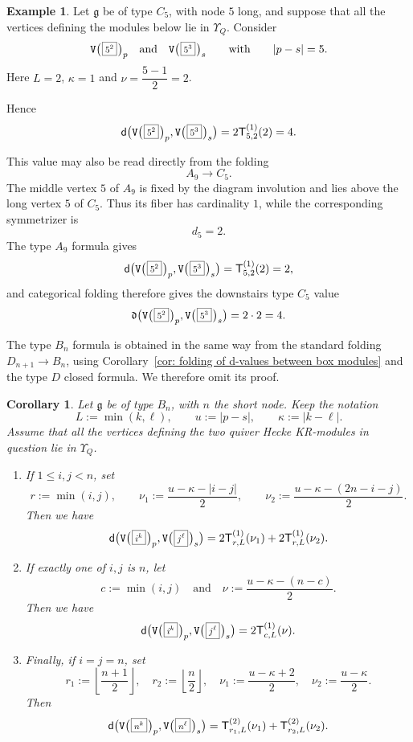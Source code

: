 \documentclass[12pt, leqno]{amsart}
\numberwithin{equation}{section}
\theoremstyle{plain}
\newtheorem{corollary}[lemma]{Corollary}
\theoremstyle{definition}
\newtheorem{example}[lemma]{Example}
\newcommand{\Vkm}[1]{%
  \ttV\bigl(\hspace{0.2ex}\scalebox{.8}{\(\boxed{#1}\)}\hspace{0.2ex}\bigr)%
}
\newcommand{\seteq}{\mathbin{:=}}
\newcommand{\g}{\mathfrak{g}}
\newcommand{\de}{\mathfrak{d}}
\newcommand{\sfT}{\mathsf{T}}
\newcommand{\ttV}{\mathtt{V}}
\newcommand{\qtq}[1][{and}]{\quad\text{{#1}}\quad}
\newcommand{\ee}{\end{enumerate}}
\newcommand{\bnum}{\begin{enumerate}[{\rm (i)}]}
\begin{document}
\begin{example}\label{ex: type C5 folded KR d-value}
Let \(\g\) be of type \(C_5\), with node \(5\) long, and suppose
that all the vertices defining the modules below lie in
\(\Upsilon_Q\).  Consider
\[
\Vkm{5^2}_p \qtq \Vkm{5^3}_s \qquad\text{with}\qquad |p-s|=5.
\]
Here $L=2$, $\kappa=1$ and $\nu=\dfrac{5-1}{2}=2$. 

Hence
\[
\de\bigl( \Vkm{5^2}_p, \Vkm{5^3}_s \bigr)
= 2\sfT^{(1)}_{5,2}(2) = 4.
\]

This value may also be read directly from the folding
\[
A_9\longrightarrow C_5.
\]
The middle vertex \(5\) of \(A_9\) is fixed by the diagram
involution and lies above the long vertex \(5\) of \(C_5\).  Thus
its fiber has cardinality \(1\), while the corresponding
symmetrizer is
\[
d_5=2.
\]
The type \(A_9\) formula gives
\[
\de\bigl(
\Vkm{5^2}_p,
\Vkm{5^3}_s
\bigr)
=
\sfT^{(1)}_{5,2}(2)
=
2,
\]
and categorical folding therefore gives the downstairs type \(C_5\)
value
\[
\de\bigl(
\Vkm{5^2}_p,
\Vkm{5^3}_s
\bigr)
=
2\cdot2
=
4.
\]
\end{example}

The type \(B_n\) formula is obtained in the same way from the
standard folding \(D_{n+1}\to B_n\), using
Corollary~\ref{cor: folding of d-values between box modules} and the
type \(D\) closed formula.  We therefore omit its proof.

\begin{corollary}\label{cor: type B quiver Hecke KR closed formula}
Let \(\g\) be of type \(B_n\), with \(n\) the short node.  Keep the
notation
\[
L\seteq\min(k,\ell), \qquad u\seteq|p-s|, \qquad \kappa\seteq|k-\ell|.
\]
Assume that all the vertices defining the two quiver Hecke KR-modules in question lie in \(\Upsilon_Q\).
\bnum
\item If \(1\leq i,j<n\), set
\[
r\seteq\min(i,j), \qquad \nu_1\seteq\frac{u-\kappa-|i-j|}{2}, \qquad \nu_2\seteq\frac{u-\kappa-(2n-i-j)}{2}.
\]
Then we have
\[
\de\bigl( \Vkm{i^k}_p, \Vkm{j^\ell}_s \bigr) = 2\sfT^{(1)}_{r,L}(\nu_1) + 2\sfT^{(1)}_{r,L}(\nu_2).
\]
\item  If exactly one of \(i,j\) is \(n\), let
\[
c\seteq\min(i,j) \qtq \nu\seteq \frac{u-\kappa-(n-c)}{2}. 
\]
Then we have
\[
\de\bigl( \Vkm{i^k}_p, \Vkm{j^\ell}_s \bigr) = 2\sfT^{(1)}_{c,L}(\nu). 
\]
\item  Finally, if \(i=j=n\), set
\[
r_1\seteq \left\lfloor\frac{n+1}{2}\right\rfloor, \quad r_2\seteq \left\lfloor\frac{n}{2}\right\rfloor,
\quad
\nu_1\seteq\frac{u-\kappa+2}{2}, \quad \nu_2\seteq\frac{u-\kappa}{2}.
\]
Then
\[
\de\bigl( \Vkm{n^k}_p, \Vkm{n^\ell}_s \bigr) = \sfT^{(2)}_{r_1,L}(\nu_1) + \sfT^{(2)}_{r_2,L}(\nu_2).
\]
\ee 
\end{corollary}
\end{document}
